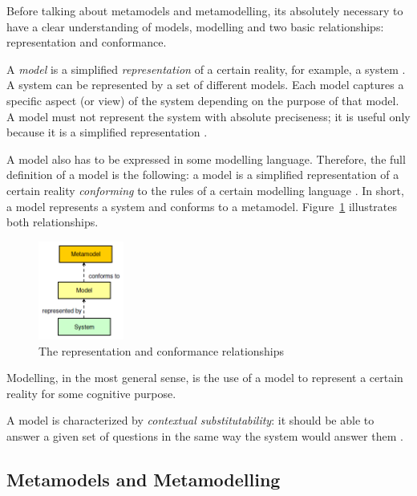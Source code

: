 Before talking about metamodels and metamodelling, its absolutely necessary to have a clear understanding of models, modelling and two basic relationships: representation and conformance. 

A \textit{model} is a simplified \textit{representation} of a certain reality, for example, a system \cite{Genova09}.
A system can be represented by a set of different models.
Each model captures a specific aspect (or view) of the system depending on the purpose of that model.
A model must not represent the system with absolute preciseness; it is useful only because it is a simplified representation \cite{Genova09}.

A model also has to be expressed in some modelling language.
Therefore, the full definition of a model is the following: a model is a simplified representation of a certain reality \textit{conforming} to the rules of a certain modelling language \cite{Genova09}. In short, a model represents a system and conforms to a metamodel. Figure~\ref{figure:representation-and-conformance} illustrates both relationships.

\begin{figure}[h]
	\centering
	\includegraphics[width=0.25\textwidth]{images/representation-and-conformance-relationships.png}
	\caption{The representation and conformance relationships \cite{Genova09}}
	\label{figure:representation-and-conformance}
\end{figure}

Modelling, in the most general sense, is the use of a model to represent a certain reality for some cognitive purpose.

A model is characterized by \textit{contextual substitutability}: it should be able to answer a given set of questions in the same way the system would answer them \cite{Genova09}.

\subsection{Metamodels and Metamodelling}

